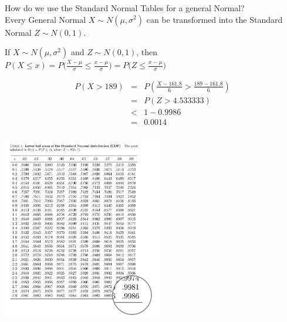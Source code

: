 \documentclass[t,xcolor=pdftex,dvipsnames,table]{beamer}\usepackage[]{graphicx}\usepackage[]{color}
\begin{document}
\begin{frame}\frametitle{}

How do we use the Standard Normal Tables for a general Normal?  \\ 

\vspace{.5cm} 
Every General Normal $X \sim N(\mu, \sigma^2)$ can be transformed into the Standard Normal $Z \sim N(0,1)$. 

\vspace{.5cm} 
\begin{definition}
If $X \sim N(\mu, \sigma^2)$ and $Z \sim N(0, 1)$, then \\
$P( X \leq x) = P \Big( \frac{X-\mu}{\sigma} \leq \frac{x-\mu}{\sigma}  \Big)= P \Big( Z \leq \frac{x-\mu}{\sigma}  \Big)$
\end{definition}

\begin{eqnarray*}
P(X > 189) & = & P( \frac{X-161.8}{6} > \frac{189-161.8}{6}) \\
& = & P(Z > 4.533333)  \\
& < & 1-0.9986 \\
& = & 0.0014
\end{eqnarray*}
\end{frame}

\begin{frame}[fragile]\frametitle{}

\includegraphics[height=8cm]{../images/NormalTableEg2.jpg}

\end{frame}
\end{document}
